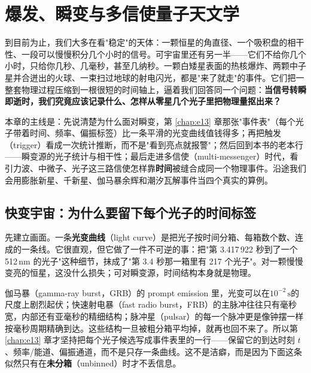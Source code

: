 \chapter{爆发、瞬变与多信使量子天文学}
\label{chap:e20}

\begin{chapteropening}
到目前为止，我们大多在看"稳定"的天体：一颗恒星的角直径、一个吸积盘的相干性、一段可以慢慢积分几个小时的信号。可宇宙里还有另一半——它们不给你几个小时，只给你几秒、几毫秒，甚至几纳秒。一颗白矮星表面的热核爆炸、两颗中子星并合迸出的火球、一束扫过地球的射电闪光，都是"来了就走"的事件。它们把一整套物理过程压缩到一根很短的时间轴上，逼着我们回答同一个问题：\textbf{当信号转瞬即逝时，我们究竟应该记录什么、怎样从零星几个光子里把物理量抠出来？}

本章的主线是：先说清楚为什么面对瞬变，第 \ref{chap:e13} 章那张"事件表"（每个光子带着时间、频率、偏振标签）比一条平滑的光变曲线值钱得多；再把触发（trigger）看成一次统计推断，而不是"看到亮点就报警"；然后回到本书的老本行——瞬变源的光子统计与相干性；最后走进多信使（multi-messenger）时代，看引力波、中微子、光子这三路信使怎样靠\textbf{时间}被缝合成同一个物理事件。沿途我们会用膨胀新星、千新星、伽马暴余辉和潮汐瓦解事件当四个真实的算例。
\end{chapteropening}

\section{快变宇宙：为什么要留下每个光子的时间标签}
\label{sec:e20-fast}

先建立画面。一条\textbf{光变曲线}（light curve）是把光子按时间分箱、每箱数个数、连成的一条线。它很直观，但它做了一件不可逆的事：把"第 3.417\,922 秒到了一个 512\,nm 的光子"这种细节，抹成了"第 3.4 秒那一箱里有 217 个光子"。对一颗慢慢变亮的恒星，这没什么损失；可对瞬变源，时间结构本身就是物理。

伽马暴（gamma-ray burst，GRB）的 prompt emission 里，光变可以在\(10^{-2}\,\mathrm{s}\)的尺度上剧烈起伏；快速射电暴（fast radio burst，FRB）的主脉冲往往只有毫秒宽，内部还有亚毫秒的精细结构；脉冲星（pulsar）的每一个脉冲更是像钟摆一样按毫秒周期精确到达。这些结构一旦被粗分箱平均掉，就再也回不来了。所以第 \ref{chap:e13} 章才坚持把每个光子候选写成事件表里的一行——保留它的到达时刻 \(t\)、频率/能道、偏振通道，而不是只存一条曲线。这不是洁癖，而是因为下面这条似然只有在\textbf{未分箱}（unbinned）时才不丢信息。

